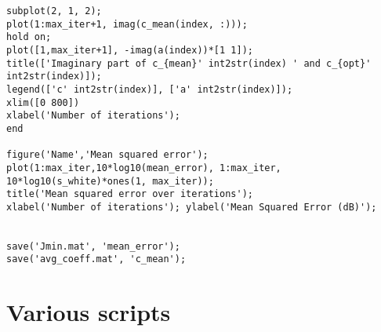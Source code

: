 \documentclass[a4paper,10pt]{article}
\begin{document}
\begin{verbatim}
subplot(2, 1, 2);
plot(1:max_iter+1, imag(c_mean(index, :)));
hold on;
plot([1,max_iter+1], -imag(a(index))*[1 1]);
title(['Imaginary part of c_{mean}' int2str(index) ' and c_{opt}' int2str(index)]);
legend(['c' int2str(index)], ['a' int2str(index)]);
xlim([0 800])
xlabel('Number of iterations');
end

figure('Name','Mean squared error');
plot(1:max_iter,10*log10(mean_error), 1:max_iter, 10*log10(s_white)*ones(1, max_iter));
title('Mean squared error over iterations');
xlabel('Number of iterations'); ylabel('Mean Squared Error (dB)');


save('Jmin.mat', 'mean_error');
save('avg_coeff.mat', 'c_mean');
\end{verbatim}


\section{Various scripts}
\end{document}
